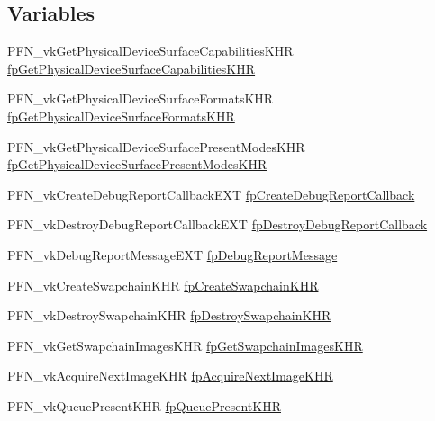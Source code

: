 \subsection*{Variables}
\begin{DoxyCompactItemize}
\item 
P\+F\+N\+\_\+vk\+Get\+Physical\+Device\+Surface\+Capabilities\+K\+HR \hyperlink{namespaceHatchit_1_1Graphics_1_1Vulkan_ae333237780d030710511b49e14658892}{fp\+Get\+Physical\+Device\+Surface\+Capabilities\+K\+HR}
\item 
P\+F\+N\+\_\+vk\+Get\+Physical\+Device\+Surface\+Formats\+K\+HR \hyperlink{namespaceHatchit_1_1Graphics_1_1Vulkan_a1535d0dfe0478428dc7d05582c41853f}{fp\+Get\+Physical\+Device\+Surface\+Formats\+K\+HR}
\item 
P\+F\+N\+\_\+vk\+Get\+Physical\+Device\+Surface\+Present\+Modes\+K\+HR \hyperlink{namespaceHatchit_1_1Graphics_1_1Vulkan_a2268f416c3238c667b3d5401332f4425}{fp\+Get\+Physical\+Device\+Surface\+Present\+Modes\+K\+HR}
\item 
P\+F\+N\+\_\+vk\+Create\+Debug\+Report\+Callback\+E\+XT \hyperlink{namespaceHatchit_1_1Graphics_1_1Vulkan_aa707bceec4763ef03dd2fb63a52fe139}{fp\+Create\+Debug\+Report\+Callback}
\item 
P\+F\+N\+\_\+vk\+Destroy\+Debug\+Report\+Callback\+E\+XT \hyperlink{namespaceHatchit_1_1Graphics_1_1Vulkan_a8027ad9a43c720635f30ef2ca079b9a0}{fp\+Destroy\+Debug\+Report\+Callback}
\item 
P\+F\+N\+\_\+vk\+Debug\+Report\+Message\+E\+XT \hyperlink{namespaceHatchit_1_1Graphics_1_1Vulkan_a0715164d42084640b94352354593c88a}{fp\+Debug\+Report\+Message}
\item 
P\+F\+N\+\_\+vk\+Create\+Swapchain\+K\+HR \hyperlink{namespaceHatchit_1_1Graphics_1_1Vulkan_a27f176402f9abc61260d6ec525832df7}{fp\+Create\+Swapchain\+K\+HR}
\item 
P\+F\+N\+\_\+vk\+Destroy\+Swapchain\+K\+HR \hyperlink{namespaceHatchit_1_1Graphics_1_1Vulkan_a862ec8e193a677e140808cad4b0e2a3e}{fp\+Destroy\+Swapchain\+K\+HR}
\item 
P\+F\+N\+\_\+vk\+Get\+Swapchain\+Images\+K\+HR \hyperlink{namespaceHatchit_1_1Graphics_1_1Vulkan_a2465b199c11e905ffb9082b168cf8e85}{fp\+Get\+Swapchain\+Images\+K\+HR}
\item 
P\+F\+N\+\_\+vk\+Acquire\+Next\+Image\+K\+HR \hyperlink{namespaceHatchit_1_1Graphics_1_1Vulkan_a6569fbd3e5d7a3510fd84b54f407a508}{fp\+Acquire\+Next\+Image\+K\+HR}
\item 
P\+F\+N\+\_\+vk\+Queue\+Present\+K\+HR \hyperlink{namespaceHatchit_1_1Graphics_1_1Vulkan_a897bf4d08b3e5ad31878a7a5e82254fb}{fp\+Queue\+Present\+K\+HR}
\end{DoxyCompactItemize}


